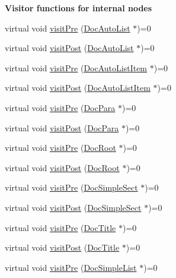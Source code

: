 \begin{Indent}{\bf Visitor functions for internal nodes}\par
\begin{DoxyCompactItemize}
\item 
virtual void \hyperlink{class_doc_visitor_ad19af23c9a793e7b224df2a9e63f8abb}{visit\+Pre} (\hyperlink{class_doc_auto_list}{Doc\+Auto\+List} $\ast$)=0
\item 
virtual void \hyperlink{class_doc_visitor_afc37187eb3ca61b7bb0b730636324966}{visit\+Post} (\hyperlink{class_doc_auto_list}{Doc\+Auto\+List} $\ast$)=0
\item 
virtual void \hyperlink{class_doc_visitor_a8401a2388c52c4dacbe9121b3e24bbe5}{visit\+Pre} (\hyperlink{class_doc_auto_list_item}{Doc\+Auto\+List\+Item} $\ast$)=0
\item 
virtual void \hyperlink{class_doc_visitor_a2d28f1aba8f013fbf165492bc0b4cf32}{visit\+Post} (\hyperlink{class_doc_auto_list_item}{Doc\+Auto\+List\+Item} $\ast$)=0
\item 
virtual void \hyperlink{class_doc_visitor_aadca3f9fde4584c4776c8e96c6381f2b}{visit\+Pre} (\hyperlink{class_doc_para}{Doc\+Para} $\ast$)=0
\item 
virtual void \hyperlink{class_doc_visitor_ad6f2864a77c4ee94e3864ca7359e8e44}{visit\+Post} (\hyperlink{class_doc_para}{Doc\+Para} $\ast$)=0
\item 
virtual void \hyperlink{class_doc_visitor_a3eaf72c546eb9c7b7721f2be0f9e0bec}{visit\+Pre} (\hyperlink{class_doc_root}{Doc\+Root} $\ast$)=0
\item 
virtual void \hyperlink{class_doc_visitor_a36cee35f6be334919905f0afd04a6fa5}{visit\+Post} (\hyperlink{class_doc_root}{Doc\+Root} $\ast$)=0
\item 
virtual void \hyperlink{class_doc_visitor_a906a10ecd102203e2a8121f7d08a37dc}{visit\+Pre} (\hyperlink{class_doc_simple_sect}{Doc\+Simple\+Sect} $\ast$)=0
\item 
virtual void \hyperlink{class_doc_visitor_a27dd28a0cd024947d0fa5fb4c2420d4b}{visit\+Post} (\hyperlink{class_doc_simple_sect}{Doc\+Simple\+Sect} $\ast$)=0
\item 
virtual void \hyperlink{class_doc_visitor_a4f3edcfaa1f39b8e385f5fc6ad07a1fa}{visit\+Pre} (\hyperlink{class_doc_title}{Doc\+Title} $\ast$)=0
\item 
virtual void \hyperlink{class_doc_visitor_a9164730bf7b367e75b9288b0497e1966}{visit\+Post} (\hyperlink{class_doc_title}{Doc\+Title} $\ast$)=0
\item 
virtual void \hyperlink{class_doc_visitor_a383cc026d701e1447c1ada6cc566b328}{visit\+Pre} (\hyperlink{class_doc_simple_list}{Doc\+Simple\+List} $\ast$)=0

\end{DoxyCompactItemize}
\end{Indent}

